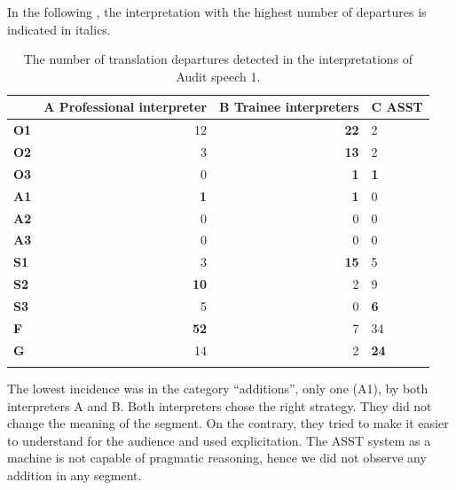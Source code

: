 \documentclass[output=paper]{langscibook}
\begin{document}
In the following , the interpretation with the highest number of departures is indicated in italics.

\begin{table}

\begin{tabularx}{\textwidth}{lrrY}
\lsptoprule
 & { {A}}  {Professional interpreter} & { {B}}  {Trainee interpreters} & { {C}}  {ASST}\\
 \midrule
 \textbf{O1} & 12 & \textbf{22} & 2\\
 \textbf{O2} & 3 & \textbf{13} & 2\\
 \textbf{O3} & 0 & \textbf{1} & \textbf{1}\\
 \tablevspace
 \textbf{A1} & \textbf{1} & \textbf{1} & 0\\
 \textbf{A2} & 0 & 0 & 0\\
 \textbf{A3} & 0 & 0 & 0\\
 \tablevspace
 \textbf{S1} & 3 & \textbf{15} & 5\\
 \textbf{S2} & \textbf{10} & 2 & 9\\
 \textbf{S3} & 5 & 0 & \textbf{6}\\
 \tablevspace
 \textbf{F} & \textbf{52} & 7 & 34\\
 \textbf{G} & 14 & 2 & \textbf{24}\\
\lspbottomrule
\end{tabularx}
\caption{The number of translation departures detected in the interpretations of Audit speech 1.}
\label{tab:kloudova:4}
\end{table}

The lowest incidence was in the category “additions”, only one (A1), by both interpreters A and B. Both interpreters chose the right strategy. They did not change the meaning of the segment. On the contrary, they tried to make it easier to understand for the audience and used explicitation. The ASST system as a machine is not capable of pragmatic reasoning, hence we did not observe any addition in any segment.
\end{document}
